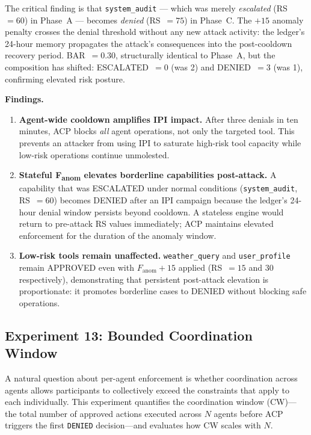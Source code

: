 \documentclass[11pt]{article}
\theoremstyle{definition}
\begin{document}
The critical finding is that \texttt{system\_audit} --- which was merely
\emph{escalated} (RS~$=60$) in Phase~A --- becomes \emph{denied} (RS~$=75$)
in Phase~C.
The $+15$ anomaly penalty crosses the denial threshold without any new attack
activity: the ledger's 24-hour memory propagates the attack's consequences
into the post-cooldown recovery period.
BAR~$=0.30$, structurally identical to Phase~A,
but the composition has shifted: ESCALATED~$=0$ (was 2) and DENIED~$=3$
(was 1), confirming elevated risk posture.

\textbf{Findings.}

\begin{enumerate}[noitemsep]
  \item \textbf{Agent-wide cooldown amplifies IPI impact.}
        After three denials in ten minutes, ACP blocks \emph{all} agent
        operations, not only the targeted tool.
        This prevents an attacker from using IPI to saturate high-risk
        tool capacity while low-risk operations continue unmolested.

  \item \textbf{Stateful F\textsubscript{anom} elevates borderline capabilities post-attack.}
        A capability that was ESCALATED under normal conditions
        (\texttt{system\_audit}, RS~$=60$) becomes DENIED after an IPI campaign
        because the ledger's 24-hour denial window persists beyond cooldown.
        A stateless engine would return to pre-attack RS values immediately;
        ACP maintains elevated enforcement for the duration of the anomaly window.

  \item \textbf{Low-risk tools remain unaffected.}
        \texttt{weather\_query} and \texttt{user\_profile} remain APPROVED
        even with $F_\text{anom}+15$ applied (RS~$=15$ and $30$ respectively),
        demonstrating that persistent post-attack elevation is proportionate:
        it promotes borderline cases to DENIED without blocking safe operations.
\end{enumerate}

\subsection{Experiment 13: Bounded Coordination Window}
\label{sec:exp13}

A natural question about per-agent enforcement is whether coordination across
agents allows participants to collectively exceed the constraints that apply to
each individually.
This experiment quantifies the coordination window (CW)---the total number of
approved actions executed across $N$ agents before ACP triggers the first
\texttt{DENIED} decision---and evaluates how CW scales with $N$.
\end{document}

